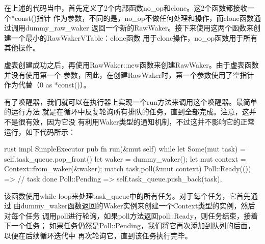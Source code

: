 在上述的代码当中，首先定义了2个内部函数no\_op和clone。这2个函数都接收一个*const()指针
作为参数，不同的是，no\_op不做任何处理和操作，而clone函数通过调用dummy\_raw\_waker
返回一个新的RawWaker。接下来使用这两个函数来创建一个最小的RawWakerVTable：clone函数
用于clone操作，no\_op函数用于所有其他操作。

虚表创建成功之后，再使用RawWaker::new函数来创建RawWaker。由于虚表函数并没有使用第一个
参数，因此，在创建RawWaker时，第一个参数使用了空指针作为代替（0 as *const()）。

有了唤醒器，我们就可以在执行器上实现一个run方法来调用这个唤醒器。最简单的运行方法
就是在循环中反复轮询所有排队的任务，直到全部完成。注意，这并不是很有效，因为它没
有利用Waker类型的通知机制，不过这并不影响它的正常运行，如下代码所示：
\begin{code-block}{rust}
impl SimpleExecutor {
    pub fn run(&mut self) {
        while let Some(mut task) = self.task_queue.pop_front() {
            let waker = dummy_waker();
            let mut context = Context::from_waker(&waker);
            match task.poll(&mut context) {
                Poll::Ready(()) => {} // task done
                Poll::Pending => self.task_queue.push_back(task),
            }
        }
    }
}
\end{code-block}
该函数使用while-loop来处理task\_queue中的所有任务。对于每个任务，它首先通过
由dummy\_waker函数返回的Waker实例来创建一个Context类型的实例，然后对每个任务
调用poll进行轮询，如果poll方法返回poll::Ready，则任务结束，接着下一个任务；
如果任务仍然是Poll::Pending，我们将它再次添加到队列的后面，以便在后续循环迭代中
再次轮询它，直到该任务执行完毕。

